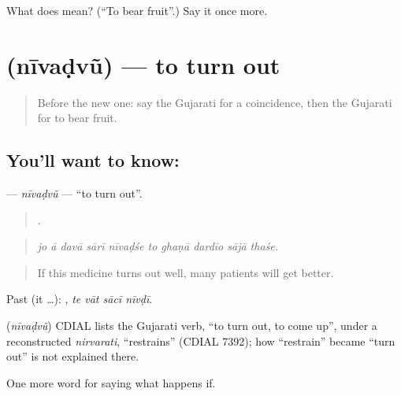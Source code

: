 \begin{tcolorbox}[breakable,colback=teal!4,colframe=teal!35!black,title={Before you move on}]
What does  mean? (\textquotedblleft{}To bear fruit\textquotedblright{}.) Say it once more.
\end{tcolorbox}
\section[\texorpdfstring{\gu{નીવડવું} (nīvaḍvũ)}{નીવડવું (nīvaḍvũ)}]{ (nīvaḍvũ) — to turn out}

\label{lesson:GU-C368-nivadvu}



\begin{quote}
Before the new one: say the Gujarati for a coincidence, then the Gujarati for to bear fruit.
\end{quote}

\subsection*{You'll want to know: }
\textbf{} — \emph{nīvaḍvũ} — \textquotedblleft{}to turn out\textquotedblright{}.

\begin{quote}
         .
\end{quote}

\begin{quote}
\emph{jo ā davā sārī nīvaḍśe to ghaṇā dardīo sājā thaśe.}
\end{quote}

\begin{quote}
If this medicine turns out well, many patients will get better.
\end{quote}

Past (it …):    , \emph{te vāt sācī nīvḍī}.

\begin{cousinweb}
\textbf{} (\emph{nīvaḍvũ}) CDIAL lists the Gujarati verb, \textquotedblleft{}to turn out, to come up\textquotedblright{}, under a reconstructed \emph{nirvarati}, \textquotedblleft{}restrains\textquotedblright{} (CDIAL 7392); how \textquotedblleft{}restrain\textquotedblright{} became \textquotedblleft{}turn out\textquotedblright{} is not explained there.
\end{cousinweb}

\begin{grammarlens}[title={What you've built}]
One more word for saying what happens if.
\end{grammarlens}

